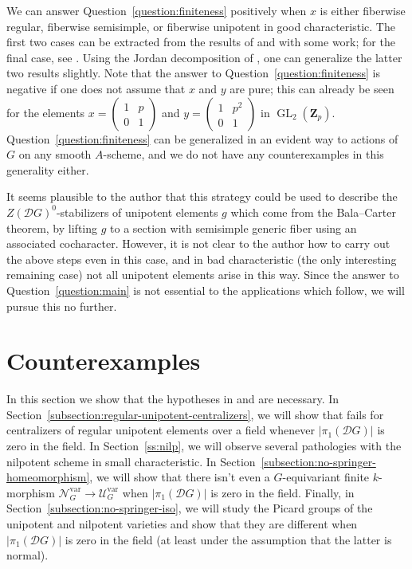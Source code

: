 \documentclass[11pt,reqno]{amsart}
\theoremstyle{definition}
\renewcommand{\rm}{\mathrm}
\newcommand{\bZ}{{\mathbf Z}}
\newcommand{\sD}{{\mathscr D}}
\newcommand{\sN}{{\mathscr N}}
\newcommand{\sU}{{\mathscr U}}
\DeclareMathOperator{\GL}{GL}
\begin{document}
We can answer Question~\ref{question:finiteness} positively when $x$ is either fiberwise regular, fiberwise semisimple, or fiberwise unipotent in good characteristic. The first two cases can be extracted from the results of \cite{Integral-Springer} and \cite{Cotner-flat} with some work; for the final case, see \cite[Theorem 5.11]{Cotner-flat}. Using the Jordan decomposition of \cite[Theorem 4.1]{Cotner-flat}, one can generalize the latter two results slightly. Note that the answer to Question~\ref{question:finiteness} is negative if one does not assume that $x$ and $y$ are pure; this can already be seen for the elements $x = \begin{pmatrix}
	1 &p \\ 0&1
\end{pmatrix}$ and $y = \begin{pmatrix}
	1 &p^2 \\ 0&1
\end{pmatrix}$ in $\GL_2(\bZ_p)$. Question~\ref{question:finiteness} can be generalized in an evident way to actions of $G$ on any smooth $A$-scheme, and we do not have any counterexamples in this generality either.

It seems plausible to the author that this strategy could be used to describe the $Z(\sD G)^0$-stabilizers of unipotent elements $g$ which come from the Bala--Carter theorem, by lifting $g$ to a section with semisimple generic fiber using an associated cocharacter. However, it is not clear to the author how to carry out the above steps even in this case, and in bad characteristic (the only interesting remaining case) not all unipotent elements arise in this way. Since the answer to Question~\ref{question:main} is not essential to the applications which follow, we will pursue this no further.
 





\section{Counterexamples}\label{section:counterexamples}

In this section we show that the hypotheses in \cite[Theorem 3.10]{Integral-Springer} and \cite[Theorem 5.1]{Integral-Springer} are necessary. In Section~\ref{subsection:regular-unipotent-centralizers}, we will show that \cite[Corollary 3.11]{Integral-Springer} fails for centralizers of regular unipotent elements over a field whenever $|\pi_1(\sD G)|$ is zero in the field. In Section~\ref{ss:nilp}, we will observe several pathologies with the nilpotent scheme in small characteristic. In Section~\ref{subsection:no-springer-homeomorphism}, we will show that there isn't even a $G$-equivariant finite $k$-morphism $\sN_G^{\rm{var}} \to \sU_G^{\rm{var}}$ when $|\pi_1(\sD G)|$ is zero in the field. Finally, in Section~\ref{subsection:no-springer-iso}, we will study the Picard groups of the unipotent and nilpotent varieties and show that they are different when $|\pi_1(\sD G)|$ is zero in the field (at least under the assumption that the latter is normal).
\end{document}
